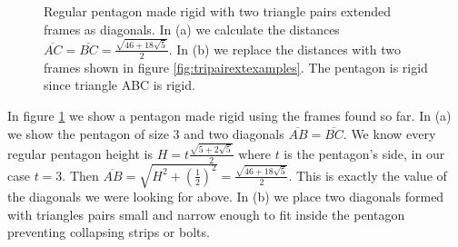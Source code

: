 \documentclass[11pt]{article}
\begin{document}
\begin{figure}[H]
 \centering
 \caption{Regular pentagon made rigid with two triangle pairs extended frames as diagonals.
 In (a) we calculate the distances $\overline{AC}=\overline{BC}=\frac{\sqrt{46+18\sqrt{5}}}2$.
 In (b) we replace the distances with two frames shown in figure \ref{fig:tripairextexamples}. The pentagon is rigid since triangle ABC is rigid.}
 \label{fig:tripairpentagon}
\end{figure}

In figure \ref{fig:tripairpentagon} we show a pentagon made rigid using the frames found so far.
In (a) we show the pentagon of size $3$ and two diagonals $\overline{AB} = \overline{BC}$. We know every regular pentagon height is $H=t\frac{\sqrt{5+2\sqrt{5}}}2$ where $t$ is the pentagon's side, in our case $t=3$. Then $\overline{AB} = \sqrt{H^2 + (\frac{1}2)^2} = \frac{\sqrt{46+18\sqrt{5}}}2$. This is exactly the value of the diagonals we were looking for above. In (b) we place two diagonals formed with triangles pairs small and narrow enough to fit inside the pentagon preventing collapsing strips or bolts.
\end{document}
